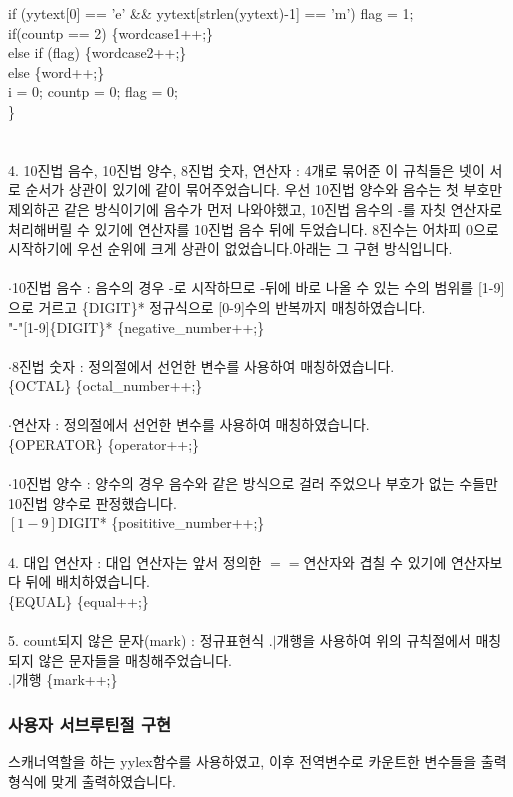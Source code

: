 \documentclass{article}
\begin{document}
		 if (yytext[0] == 'e' \&\& yytext[strlen(yytext)-1] == 'm') flag = 1;\\
		 if(countp == 2) \{wordcase1++;\}\\
		 else if (flag) \{wordcase2++;\} \\
		 else \{word++;\}\\
 		 i = 0; countp = 0; flag = 0;\\
		\}\\
        \\
        \\4. 10진법 음수, 10진법 양수, 8진법 숫자, 연산자 : 4개로 묶어준 이 규칙들은 넷이 서로 순서가 상관이 있기에 같이 묶어주었습니다. 우선 10진법 양수와 음수는 첫 부호만 제외하곤 
        같은 방식이기에 음수가 먼저 나와야했고, 10진법 음수의 -를 자칫 연산자로 처리해버릴 수 있기에 연산자를 10진법 음수 뒤에 두었습니다. 8진수는 어차피 0으로 시작하기에 우선 순위에
        크게 상관이 없었습니다.아래는 그 구현 방식입니다.\\
        \\
        $\cdot$10진법 음수 : 음수의 경우 -로 시작하므로 -뒤에 바로 나올 수 있는 수의 범위를 [1-9]으로 거르고 \{DIGIT\}* 정규식으로 [0-9]수의 반복까지 매칭하였습니다. \\
        "-"[1-9]\{DIGIT\}*	\{negative\_number++;\}\\
        \\
        $\cdot$8진법 숫자 : 정의절에서 선언한 변수를 사용하여 매칭하였습니다.\\
        \{OCTAL\}		\{octal\_number++;\}\\
        \\
        $\cdot$연산자 : 정의절에서 선언한 변수를 사용하여 매칭하였습니다.\\
        \{OPERATOR\}	\{operator++;\}\\
        \\
        $\cdot$10진법 양수 : 양수의 경우 음수와 같은 방식으로 걸러 주었으나 부호가 없는 수들만 10진법 양수로 판정했습니다.\\ 
        $[1-9]${DIGIT}*	\{posititive\_number++;\}\\
        \\
        4. 대입 연산자 : 대입 연산자는 앞서 정의한 $==$연산자와 겹칠 수 있기에 연산자보다 뒤에 배치하였습니다.\\
        \{EQUAL\}		\{equal++;\}\\
        \\
        5. count되지 않은 문자(mark) : 정규표현식 .$|$개행을 사용하여 위의 규칙절에서 매칭되지 않은 문자들을 매칭해주었습니다.\\
        .$|$개행		\{mark++;\}\\
    \subsubsection{사용자 서브루틴절 구현}
        스캐너역할을 하는 yylex함수를 사용하였고, 이후 전역변수로 카운트한 변수들을 출력형식에 맞게 출력하였습니다.\\ 
\end{document}
